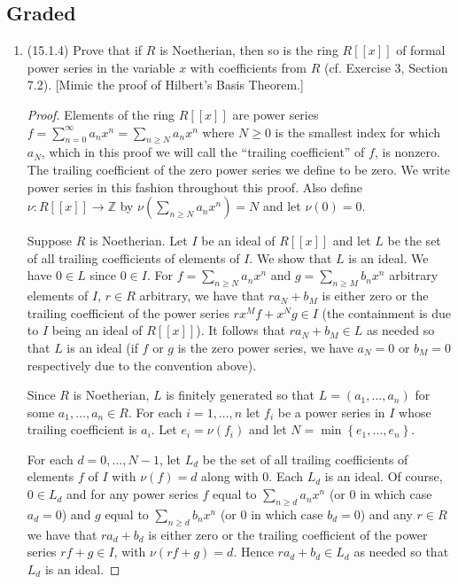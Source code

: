 \documentclass[11pt]{article}
\newcommand{\cbr}[1]{\left\{#1\right\}}
\begin{document}
\subsection*{Graded}
\begin{enumerate}
    \item (15.1.4) Prove that if $R$ is Noetherian, then so is the ring $R[[x]]$ of formal power series in the variable $x$ with coefficients from $R$ (cf. Exercise 3, Section 7.2). [Mimic the proof of Hilbert's Basis Theorem.] \begin{proof}
    Elements of the ring $R[[x]]$ are power series $f = \sum_{n=0}^\infty a_nx^n = \sum_{n\geq N}a_nx^n$ where $N\geq 0$ is the smallest index for which $a_N$, which in this proof we will call the ``trailing coefficient'' of $f$, is nonzero. The trailing coefficient of the zero power series we define to be zero. We write power series in this fashion throughout this proof. Also define $\nu\colon R[[x]]\to\mathbb{Z}$ by $\nu(\sum_{n\geq N}a_nx^n) = N$ and let $\nu(0) = 0$.

    Suppose $R$ is Noetherian. Let $I$ be an ideal of $R[[x]]$ and let $L$ be the set of all trailing coefficients of elements of $I$. We show that $L$ is an ideal. We have $0\in L$ since $0\in I$. For $f = \sum_{n\geq N}a_nx^n$ and $g = \sum_{n\geq M}b_nx^n$ arbitrary elements of $I$, $r\in R$ arbitrary, we have that $ra_N+b_M$ is either zero or the trailing coefficient of the power series $rx^Mf+x^Ng\in I$ (the containment is due to $I$ being an ideal of $R[[x]]$). It follows that $ra_N+b_M\in L$ as needed so that $L$ is an ideal (if $f$ or $g$ is the zero power series, we have $a_N = 0$ or $b_M= 0$ respectively due to the convention above).

    Since $R$ is Noetherian, $L$ is finitely generated so that $L = (a_1,\dots,a_n)$ for some $a_1,\dots,a_n\in R$. For each $i = 1,\dots,n$ let $f_i$ be a power series in $I$ whose trailing coefficient is $a_i$. Let $e_i = \nu(f_i)$ and let $N = \min\cbr{e_1,\dots,e_n}$.

    For each $d = 0,\dots,N-1$, let $L_d$ be the set of all trailing coefficients of elements $f$ of $I$ with $\nu(f) = d$ along with $0$. Each $L_d$ is an ideal. Of course, $0\in L_d$ and for any power series $f $ equal to $ \sum_{n\geq d}a_nx^n$ (or $0$ in which case $a_d = 0$) and $g$ equal to $\sum_{n\geq d}b_nx^n$ (or $0$ in which case $b_d = 0$) and any $r\in R$ we have that $ra_d+b_d$ is either zero or the trailing coefficient of the power series $rf+g\in I$, with $\nu(rf+g) = d$. Hence $ra_d+b_d\in L_d$ as needed so that $L_d$ is an ideal.


\end{proof}
\end{enumerate}
\end{document}
